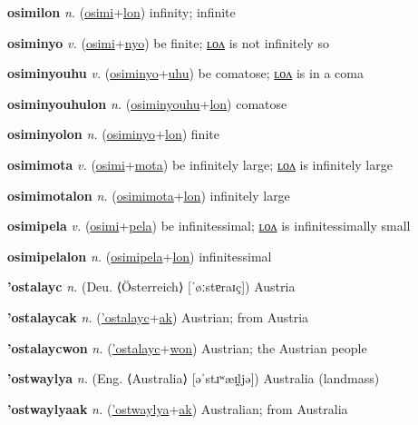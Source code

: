 \textbf{\hypertarget{osimilon}{osimilon}} \textit{n.} (\hyperlink{osimi}{osimi}+\allowbreak \hyperlink{lon}{lon})
infinity; infinite

\textbf{\hypertarget{osiminyo}{osiminyo}} \textit{v.} (\hyperlink{osimi}{osimi}+\allowbreak \hyperlink{nyo}{nyo})
be finite; \hyperlink{osiminyolon}{ʟᴏᴧ} is not infinitely so

\textbf{\hypertarget{osiminyouhu}{osiminyouhu}} \textit{v.} (\hyperlink{osiminyo}{osiminyo}+\allowbreak \hyperlink{uhu}{uhu})
be comatose; \hyperlink{osiminyouhulon}{ʟᴏᴧ} is in a coma

\textbf{\hypertarget{osiminyouhulon}{osiminyouhulon}} \textit{n.} (\hyperlink{osiminyouhu}{osiminyouhu}+\allowbreak \hyperlink{lon}{lon})
comatose

\textbf{\hypertarget{osiminyolon}{osiminyolon}} \textit{n.} (\hyperlink{osiminyo}{osiminyo}+\allowbreak \hyperlink{lon}{lon})
finite

\textbf{\hypertarget{osimimota}{osimimota}} \textit{v.} (\hyperlink{osimi}{osimi}+\allowbreak \hyperlink{mota}{mota})
be infinitely large; \hyperlink{osimimotalon}{ʟᴏᴧ} is infinitely large

\textbf{\hypertarget{osimimotalon}{osimimotalon}} \textit{n.} (\hyperlink{osimimota}{osimimota}+\allowbreak \hyperlink{lon}{lon})
infinitely large

\textbf{\hypertarget{osimipela}{osimipela}} \textit{v.} (\hyperlink{osimi}{osimi}+\allowbreak \hyperlink{pela}{pela})
be infinitessimal; \hyperlink{osimipelalon}{ʟᴏᴧ} is infinitessimally small

\textbf{\hypertarget{osimipelalon}{osimipelalon}} \textit{n.} (\hyperlink{osimipela}{osimipela}+\allowbreak \hyperlink{lon}{lon})
infinitessimal

\textbf{\hypertarget{'ostalayc}{'ostalayc}} \textit{n.} (Deu. ⟨Österreich⟩ [ˈøːstɐraɪç])
Austria

\textbf{\hypertarget{'ostalaycak}{'ostalaycak}} \textit{n.} (\hyperlink{'ostalayc}{'ostalayc}+\allowbreak \hyperlink{ak}{ak})
Austrian; from Austria

\textbf{\hypertarget{'ostalaycwon}{'ostalaycwon}} \textit{n.} (\hyperlink{'ostalayc}{'ostalayc}+\allowbreak \hyperlink{won}{won})
Austrian; the Austrian people

\textbf{\hypertarget{'ostwaylya}{'ostwaylya}} \textit{n.} (Eng. ⟨Australia⟩ [əˈstɹʷæɪ̯ljə])
Australia (landmass)

\textbf{\hypertarget{'ostwaylyaak}{'ostwaylyaak}} \textit{n.} (\hyperlink{'ostwaylya}{'ostwaylya}+\allowbreak \hyperlink{ak}{ak})
Australian; from Australia


